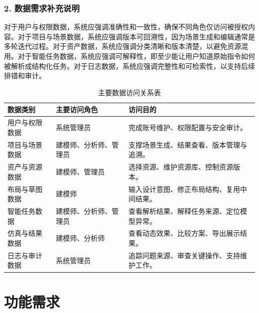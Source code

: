 \documentclass[UTF8,a4paper,10pt]{ctexart}
\begin{document}
\subsubsection*{2. 数据需求补充说明}
对于用户与权限数据，系统应强调准确性和一致性，确保不同角色仅访问被授权内容。对于项目与场景数据，系统应强调版本可回溯性，因为场景生成和编辑通常是多轮迭代过程。对于资产数据，系统应强调分类清晰和版本清楚，以避免资源混用。对于智能任务数据，系统应强调可解释性，即至少能让用户知道原始指令如何被解析成结构化任务。对于日志数据，系统应强调完整性和可检索性，以支持后续排错和审计。

{
\renewcommand{\arraystretch}{1.35}

\begin{table}[H]
\centering
\caption{主要数据访问关系表}

\begin{tabularx}{\textwidth}{p{3.0cm} p{3.2cm} Y}
\toprule
{}
\textbf{数据类别} & \textbf{主要访问角色} & \textbf{访问目的} \\
\midrule

用户与权限数据 & 系统管理员 & 完成账号维护、权限配置与安全审计。 \\

项目与场景数据 & 建模师、分析师、管理员 & 支撑场景生成、结果查看、版本管理与追溯。 \\

资产与资源数据 & 建模师、管理员 & 选择资源、维护资源库、控制资源版本。 \\

布局与草图数据 & 建模师 & 输入设计意图、修正布局结构、复用中间结果。 \\

智能任务数据 & 建模师、分析师、管理员 & 查看解析结果、解释任务来源、定位模型异常。 \\

仿真与结果数据 & 建模师、分析师 & 查看动态效果、比较方案、导出展示结果。 \\

日志与审计数据 & 系统管理员 & 追踪问题来源、审查关键操作、支持维护工作。 \\

\bottomrule
\end{tabularx}
\end{table}
}

\section{功能需求}
\end{document}
